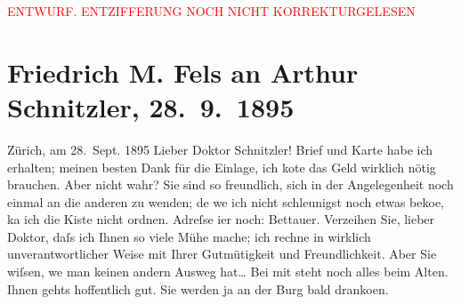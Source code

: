 
\begin{center}
            \textcolor{red}{ENTWURF. ENTZIFFERUNG NOCH NICHT KORREKTURGELESEN}
                      \end{center}
            
               \section[Friedrich M. Fels an Arthur Schnitzler, 28. 9. 1895]{ Friedrich M. Fels an Arthur Schnitzler, 28. 9. 1895}\nopagebreak{}\rehead{ }\begin{ledgroupsized}[t]{13cm}\normalsize\beginnumbering{} \toendnotes[C]{\smallbreak\pagebreak[2]} 
\toendnotes[C]{\smallbreak}\pstart
           \raggedleft{}{\pb}Zürich, am 28. Sept. 1895\pend
           \pstart\center{}Lieber Doktor Schnitzler!\pend\pstart
           Brief und Karte habe ich erhalten; meinen besten Dank für die Einlage, ich ko{\geminationn}te das Geld wirklich nötig brauchen. Aber nicht
                    wahr? Sie sind so freundlich, sich in der Angelegenheit noch einmal an die
                    anderen zu wenden; de{\geminationn} we{\geminationn} ich nicht \introOben{}schleunigst\introOben{}
                    noch etwas beko{\geminationm}e, ka{\geminationn}
                    ich die Kiste nicht ordnen. Adreſse i{\geminationm}er noch: Bettauer.\pend
           \pstart
           Verzeihen Sie, lieber Doktor, daſs ich Ihnen so viele Mühe mache; ich rechne in
                    wirklich unverantwortlicher Weise mit Ihrer Gutmütigkeit und Freundlichkeit.
                    Aber Sie wiſsen, we{\geminationn} man keinen andern Ausweg hat{\dots}\pend
           \pstart
           Bei mit steht noch alles beim Alten. Ihnen gehts hoffentlich gut. Sie werden ja
                    an der Burg bald dranko{\geminationm}en.\pend

\end{ledgroupsized}
